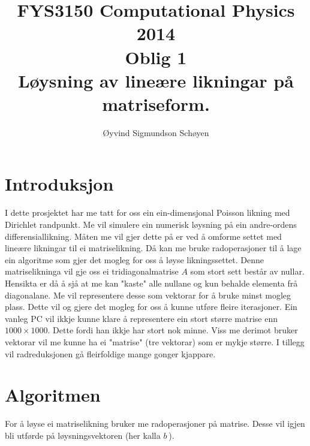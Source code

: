 \documentclass[11pt, a4paper]{article}
\begin{document}
\begin{titlepage}

  \title{\normalsize FYS3150 Computational Physics 2014\\
  \vspace{10mm}
  \huge Oblig 1\\
  \vspace{10mm}
  \normalsize {\bf Løysning av lineære likningar på matriseform.}}

  \author{Øyvind Sigmundson Schøyen}

\end{titlepage}
\maketitle

\newpage
  \tableofcontents
\newpage

\section{Introduksjon}
  I dette prosjektet har me tatt for oss ein ein-dimensjonal Poisson likning med Dirichlet randpunkt.
  Me vil simulere ein numerisk løysning på ein andre-ordens differensiallikning.
  Måten me vil gjer dette på er ved å omforme settet med lineære likningar til ei matriselikning. Då 
  kan me bruke radoperasjoner til å lage ein algoritme som gjer det mogleg for oss å løyse 
  likningssettet. Denne matriselikninga vil gje oss ei tridiagonalmatrise $A$ som stort sett består av  nullar. Hensikta er då å sjå at me kan "kaste" alle nullane og kun behalde elementa frå diagonalane.
  Me vil representere desse som vektorar for å bruke minst mogleg plass. Dette vil og gjere det mogleg  for oss å kunne utføre fleire iterasjoner. Ein vanleg PC vil ikkje kunne klare å representere ein 
  stort større matrise enn $1000\times1000$. Dette fordi han ikkje har stort nok minne. Viss me 
  derimot bruker vektorar vil me kunne ha ei "matrise" (tre vektorar) som er mykje større. I tillegg 
  vil radreduksjonen gå fleirfoldige mange gonger kjappare.

\section{Algoritmen}
  For å løyse ei matriselikning bruker me radoperasjoner på matrise. Desse vil igjen bli utførde på
  løysningsvektoren (her kalla $b^~$). 
\end{document}
